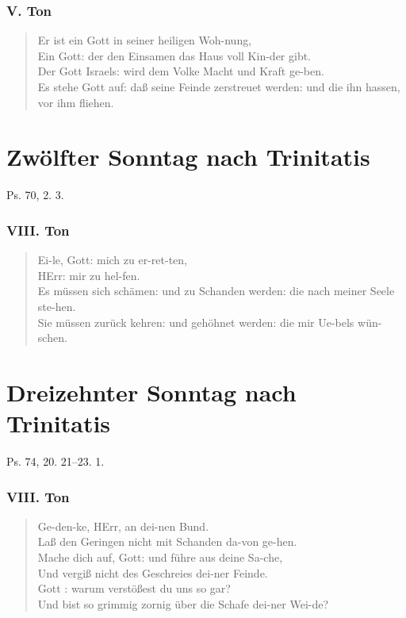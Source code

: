 \subsubsection{V. Ton}
\begin{verse}
Er ist ein Gott in seiner heiligen Woh-nung,\\
Ein Gott: der den Einsamen das Haus voll Kin-der gibt.\\
Der Gott Israels: wird dem Volke Macht und Kraft ge-ben.\\
Es stehe Gott auf: daß seine Feinde zerstreuet werden: und die ihn hassen, vor ihm fliehen.
\end{verse}

\section{Zwölfter Sonntag nach Trinitatis}

Ps. 70, 2. 3.

\subsubsection{VIII. Ton}
\begin{verse}
Ei-le, Gott: mich zu er-ret-ten,\\
HErr: mir zu hel-fen.\\
Es müssen sich schämen: und zu Schanden werden: die nach meiner Seele ste-hen.\\
Sie müssen zurück kehren: und gehöhnet werden: die mir Ue-bels wün-schen.
\end{verse}

\section{Dreizehnter Sonntag nach Trinitatis}

Ps. 74, 20. 21–23. 1.

\subsubsection{VIII. Ton}
\begin{verse}
Ge-den-ke, HErr, an dei-nen Bund.\\
Laß den Geringen nicht mit Schanden da-von ge-hen.\\
Mache dich auf, Gott: und führe aus deine Sa-che,\\
Und vergiß nicht des Geschreies dei-ner Feinde.\\
Gott : warum verstößest du uns so gar?\\
Und bist so grimmig zornig über die Schafe dei-ner Wei-de?
\end{verse}

